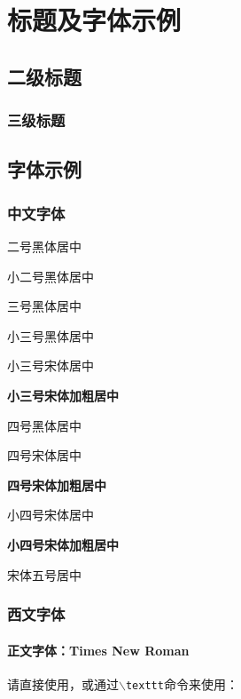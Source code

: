 \chapter{标题及字体示例}

\section{二级标题}

\subsection{三级标题}

\section{字体示例}

\subsection{中文字体}

\begin{center}
    \heiti 二号黑体居中

    \heiti 小二号黑体居中

    \heiti 三号黑体居中

    \heiti 小三号黑体居中
    
    \songti 小三号宋体居中
    
    {\bfseries\songti 小三号宋体加粗居中}

    \heiti 四号黑体居中
    
    \songti 四号宋体居中

    {\bfseries\songti 四号宋体加粗居中}
    
    \songti 小四号宋体居中
    
    {\bfseries\songti 小四号宋体加粗居中}
    
    \songti{} 宋体五号居中
\end{center}

\subsection{西文字体}

\subsubsection{正文字体：Times New Roman}
请直接使用，或通过\texttt{$\backslash$texttt}命令来使用：

